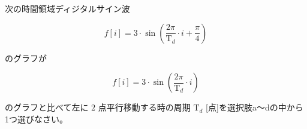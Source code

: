 次の時間領域ディジタルサイン波 

\[
f[i] = 3 \cdot \sin \left ( \frac{2 \pi}{\textrm{T}_d}  \cdot i + \frac{\pi}{4} \right )
\]

\noindent のグラフが

\[
f[i] = 3 \cdot \sin \left ( \frac{2 \pi}{\textrm{T}_d} \cdot i \right )
\]

\noindent のグラフと比べて左に $2$ 点平行移動する時の周期 $\textrm{T}_d$ [点]を選択肢a〜dの中から1つ選びなさい。
